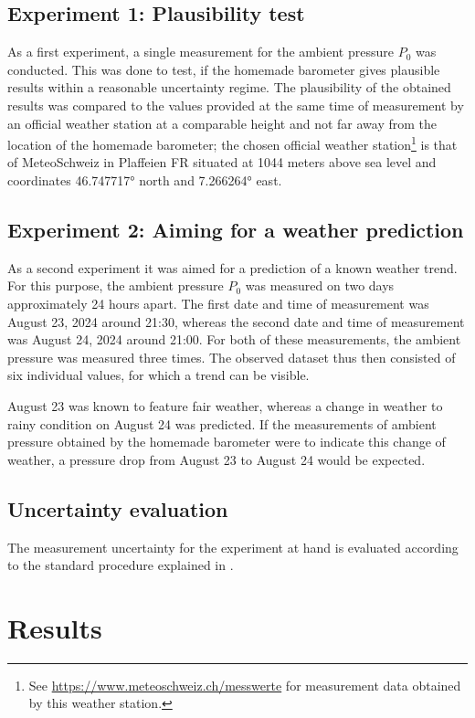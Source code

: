 \documentclass[a4paper,10pt, twocolumn]{article}
\begin{document}
\subsection{Experiment 1: Plausibility test}
As a first experiment, a single measurement for the ambient pressure $P_0$ was conducted. This was done to test, if the homemade barometer gives plausible results within a reasonable uncertainty regime. The plausibility of the obtained results was compared to the values provided at the same time of measurement by an official weather station at a comparable height and not far away from the location of the homemade barometer; the chosen official weather station\footnote{See \href{https://www.meteoschweiz.admin.ch/service-und-publikationen/applikationen/messwerte-und-messnetze.html}{https://www.meteoschweiz.ch/messwerte} for measurement data obtained by this weather station.} is that of MeteoSchweiz in Plaffeien FR situated at 1044 meters above sea level and coordinates \ang{46.747717} north and \ang{7.266264} east.

\subsection{Experiment 2: Aiming for a weather prediction}
As a second experiment it was aimed for a prediction of a known weather trend. For this purpose, the ambient pressure $P_0$ was measured on two days approximately 24 hours apart. The first date and time of measurement was August 23, 2024 around 21:30, whereas the second date and time of measurement was August 24, 2024 around 21:00. For both of these measurements, the ambient pressure was measured three times. The observed dataset thus then consisted of six individual values, for which a trend can be visible.

August 23 was known to feature fair weather, whereas a change in weather to rainy condition on August 24 was predicted. If the measurements of ambient pressure obtained by the homemade barometer were to indicate this change of weather, a pressure drop from August 23 to August 24 would be expected.

\subsection{Uncertainty evaluation}
The measurement uncertainty for the experiment at hand is evaluated according to the standard procedure explained in \cite{GUM2023}.

\section{Results}
\end{document}
